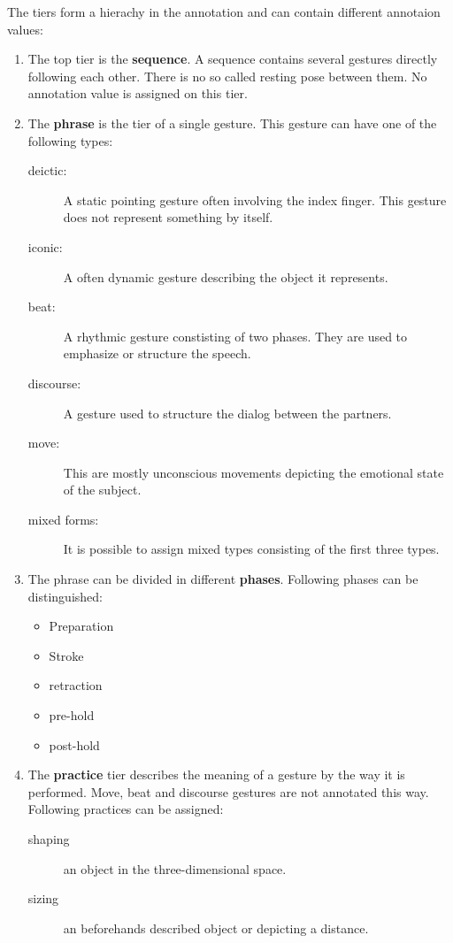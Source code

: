 \documentclass[a4paper]{article}
\begin{document}
				The tiers form a hierachy in the annotation and can contain different annotaion values:
				
				\begin{enumerate}
					\item The top tier is the \textbf{sequence}. A sequence contains several gestures directly following each other. There is no so called resting pose between them. No annotation value is assigned on this tier.
					\item The \textbf{phrase} is the tier of a single gesture. This gesture can have one of the following types:
					\begin{description}
						\item[deictic:] A static pointing gesture often involving the index finger. This gesture does not represent something by itself.
						\item[iconic:] A often dynamic gesture describing the object it represents.
						\item[beat:] A rhythmic gesture constisting of two phases. They are used to emphasize or structure the speech.
						\item[discourse:] A gesture used to structure the dialog between the partners.
						\item[move:] This are mostly unconscious movements depicting the emotional state of the subject.
						\item[mixed forms:] It is possible to assign mixed types consisting of the first three types.
					\end{description}
					\item The phrase can be divided in different \textbf{phases}. Following phases can be distinguished:
					\begin{itemize}
						\item Preparation
						\item Stroke
						\item retraction
						\item pre-hold
						\item post-hold
					\end{itemize}
					\item The \textbf{practice} tier describes the meaning of a gesture by the way it is performed. Move, beat and discourse gestures are not annotated this way. Following practices can be assigned:
					\begin{description}
						\item[shaping] an object in the three-dimensional space.
						\item[sizing] an beforehands described object or depicting a distance.

\end{description}
\end{enumerate}
\end{document}

